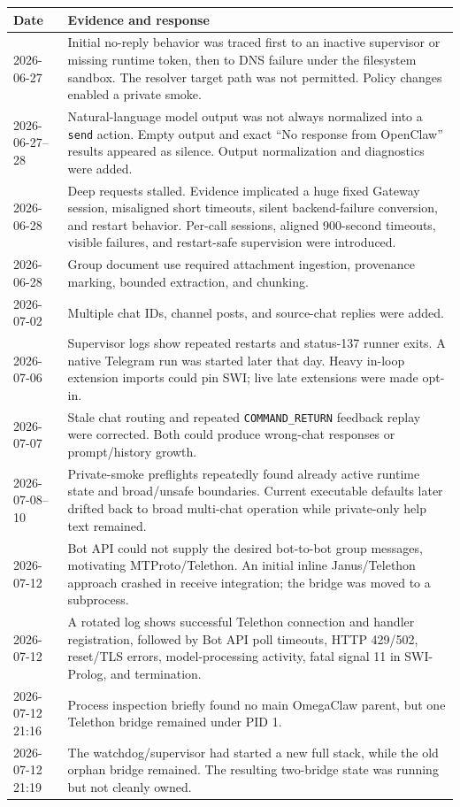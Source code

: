 \documentclass[10pt]{article}
\newcommand{\code}[1]{\texttt{#1}}
\begin{document}
\begin{longtable}{p{}p{}}
\toprule
Date & Evidence and response \\
\midrule
\endhead
2026-06-27 & Initial no-reply behavior was traced first to an inactive supervisor or missing runtime token, then to DNS failure under the filesystem sandbox. The resolver target path was not permitted. Policy changes enabled a private smoke. \\
2026-06-27--28 & Natural-language model output was not always normalized into a \code{send} action. Empty output and exact ``No response from OpenClaw'' results appeared as silence. Output normalization and diagnostics were added. \\
2026-06-28 & Deep requests stalled. Evidence implicated a huge fixed Gateway session, misaligned short timeouts, silent backend-failure conversion, and restart behavior. Per-call sessions, aligned 900-second timeouts, visible failures, and restart-safe supervision were introduced. \\
2026-06-28 & Group document use required attachment ingestion, provenance marking, bounded extraction, and chunking. \\
2026-07-02 & Multiple chat IDs, channel posts, and source-chat replies were added. \\
2026-07-06 & Supervisor logs show repeated restarts and status-137 runner exits. A native Telegram run was started later that day. Heavy in-loop extension imports could pin SWI; live late extensions were made opt-in. \\
2026-07-07 & Stale chat routing and repeated \code{COMMAND\_RETURN} feedback replay were corrected. Both could produce wrong-chat responses or prompt/history growth. \\
2026-07-08--10 & Private-smoke preflights repeatedly found already active runtime state and broad/unsafe boundaries. Current executable defaults later drifted back to broad multi-chat operation while private-only help text remained. \\
2026-07-12 & Bot API could not supply the desired bot-to-bot group messages, motivating MTProto/Telethon. An initial inline Janus/Telethon approach crashed in receive integration; the bridge was moved to a subprocess. \\
2026-07-12 & A rotated log shows successful Telethon connection and handler registration, followed by Bot API poll timeouts, HTTP 429/502, reset/TLS errors, model-processing activity, fatal signal 11 in SWI-Prolog, and termination. \\
2026-07-12 21:16 & Process inspection briefly found no main OmegaClaw parent, but one Telethon bridge remained under PID 1. \\
2026-07-12 21:19 & The watchdog/supervisor had started a new full stack, while the old orphan bridge remained. The resulting two-bridge state was running but not cleanly owned. \\
\bottomrule
\end{longtable}
\end{document}
